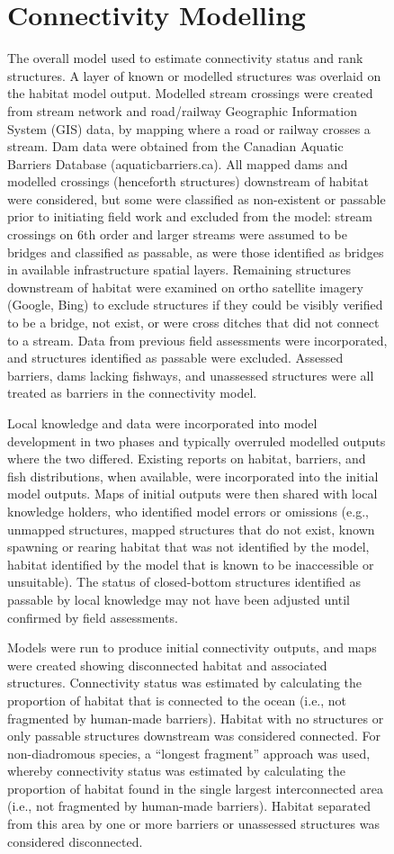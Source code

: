 \documentclass[
  letterpaper,
  DIV=11,
  numbers=noendperiod]{scrreprt}
\begin{document}
\begin{figure}
{\section*{Connectivity Modelling}\label{connectivity-modelling}


The overall model used to estimate connectivity status and rank
structures. A layer of known or modelled structures was overlaid on the
habitat model output. Modelled stream crossings were created from stream
network and road/railway Geographic Information System (GIS) data, by
mapping where a road or railway crosses a stream. Dam data were obtained
from the Canadian Aquatic Barriers Database (aquaticbarriers.ca). All
mapped dams and modelled crossings (henceforth structures) downstream of
habitat were considered, but some were classified as non-existent or
passable prior to initiating field work and excluded from the model:
stream crossings on 6th order and larger streams were assumed to be
bridges and classified as passable, as were those identified as bridges
in available infrastructure spatial layers. Remaining structures
downstream of habitat were examined on ortho satellite imagery (Google,
Bing) to exclude structures if they could be visibly verified to be a
bridge, not exist, or were cross ditches that did not connect to a
stream. Data from previous field assessments were incorporated, and
structures identified as passable were excluded. Assessed barriers, dams
lacking fishways, and unassessed structures were all treated as barriers
in the connectivity model.

Local knowledge and data were incorporated into model development in two
phases and typically overruled modelled outputs where the two differed.
Existing reports on habitat, barriers, and fish distributions, when
available, were incorporated into the initial model outputs. Maps of
initial outputs were then shared with local knowledge holders, who
identified model errors or omissions (e.g., unmapped structures, mapped
structures that do not exist, known spawning or rearing habitat that was
not identified by the model, habitat identified by the model that is
known to be inaccessible or unsuitable). The status of closed-bottom
structures identified as passable by local knowledge may not have been
adjusted until confirmed by field assessments.

Models were run to produce initial connectivity outputs, and maps were
created showing disconnected habitat and associated structures.
Connectivity status was estimated by calculating the proportion of
habitat that is connected to the ocean (i.e., not fragmented by
human-made barriers). Habitat with no structures or only passable
structures downstream was considered connected. For non-diadromous
species, a ``longest fragment'' approach was used, whereby connectivity
status was estimated by calculating the proportion of habitat found in
the single largest interconnected area (i.e., not fragmented by
human-made barriers). Habitat separated from this area by one or more
barriers or unassessed structures was considered disconnected.

}
\end{figure}
\end{document}
